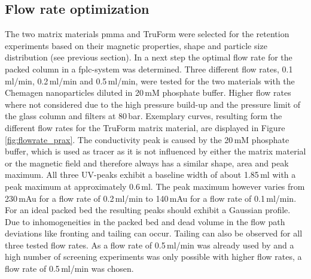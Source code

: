 % 
% 
% 


\subsection{Flow rate optimization}
\label{subsec:flow_rate_res}

The two matrix materials \gls{pmma} and TruForm were selected for the retention experiments based on their magnetic properties, shape and particle size distribution (see previous section). In a next step the optimal flow rate for the packed column in a \gls{fplc}-system was determined. Three different flow rates, 0.1\,ml/min, 0.2\,ml/min and 0.5\,ml/min, were tested for the two materials with the Chemagen nanoparticles diluted in 20\,mM phosphate buffer. Higher flow rates where not considered due to the high pressure build-up and the pressure limit of the glass column and filters at 80\,bar. Exemplary curves, resulting form the different flow rates for the TruForm matrix material, are displayed in Figure \ref{fig:flowrate_prax}. The conductivity peak is caused by the 20\,mM phosphate buffer, which is used as tracer as it is not influenced by either the matrix material or the magnetic field and therefore always has a similar shape, area and peak maximum. All three UV-peaks exhibit a baseline width of about 1.85\,ml with a peak maximum at approximately 0.6\,ml. The peak maximum however varies from 230\,mAu for a flow rate of 0.2\,ml/min to 140\,mAu for a flow rate of 0.1\,ml/min. 
For an ideal packed bed the resulting peaks should exhibit a Gaussian profile. Due to inhomogeneities in the packed bed and dead volume in the flow path deviations like fronting and tailing can occur. Tailing can also be observed for all three tested flow rates. As a flow rate of 0.5\,ml/min was already used by \cite{AndreMaster} and a high number of screening experiments was only possible with higher flow rates, a flow rate of 0.5\,ml/min was chosen.         

